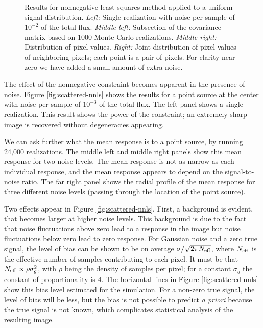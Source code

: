 \documentclass[twocolumn,tighten]{aastex61}
\begin{document}
\begin{figure}[t!]
\centering
\caption{ \label{fig:scattered-nnls-flat} Results for nonnegative least
  squares method applied to a uniform signal distribution. {\it Left:}
  Single realization with noise per sample of $10^{-2}$ of the total
  flux. {\it Middle left:} Subsection of the covariance matrix based
  on 1000 Monte Carlo realizations. {\it Middle right:} Distribution
  of pixel values. {\it Right:} Joint distribution of pixel values of
  neighboring pixels; each point is a pair of pixels. For clarity near
  zero we have added a small amount of extra noise.}
\end{figure} 

The effect of the nonnegative constraint becomes apparent in the
presence of noise.  Figure \ref{fig:scattered-nnls} shows the results
for a point source at the center with noise per sample of $10^{-3}$ of
the total flux. The left panel shows a single realization. This result
shows the power of the constraint; an extremely sharp image is
recovered without degeneracies appearing.

We can ask further what the mean response is to a point source, by
running 24,000 realizations. The middle left and middle right panels
show this mean response for two noise levels. The mean response is not
as narrow as each individual response, and the mean response appears
to depend on the signal-to-noise ratio. The far right panel shows the
radial profile of the mean response for three different noise levels
(passing through the location of the point source).

Two effects appear in Figure \ref{fig:scattered-nnls}.  First, a
background is evident, that becomes larger at higher noise
levels. This background is due to the fact that noise fluctuations
above zero lead to a response in the image but noise fluctuations
below zero lead to zero response. For Gaussian noise and a zero true
signal, the level of bias can be shown to be on average
$\sigma/\sqrt{2\pi N_{\rm eff}}$, where $N_{\rm eff}$ is the effective
number of samples contributing to each pixel. It must be that $N_{\rm
  eff} \propto \rho \sigma_g^2$, with $\rho$ being the density of
samples per pixel; for a constant $\sigma_g$ the constant of
proportionality is 4. The horizontal lines in Figure
\ref{fig:scattered-nnls} show this bias level estimated for the
simulation. For a non-zero true signal, the level of bias will be
less, but the bias is not possible to predict {\it a priori} because
the true signal is not known, which complicates statistical analysis
of the resulting image.
\end{document}
